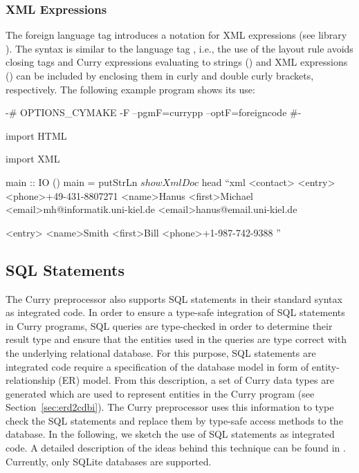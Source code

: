 \subsubsection{XML Expressions}

The foreign language tag  introduces a notation
for XML expressions (see \CYS library ).
The syntax is similar to the language tag ,
i.e., the use of the layout rule avoids closing tags
and Curry expressions evaluating to strings ()
and XML expressions () can be included by enclosing
them in curly and double curly brackets, respectively.
The following example program shows its use:
\begin{currynomath}
{-# OPTIONS_CYMAKE -F --pgmF=currypp --optF=foreigncode #-}

import HTML

import XML

main :: IO ()
main = putStrLn $ showXmlDoc $ head ``xml
 <contact>
  <entry>
   <phone>+49-431-8807271
   <name>Hanus
   <first>Michael
   <email>mh@informatik.uni-kiel.de
   <email>hanus@email.uni-kiel.de
   
  <entry>
   <name>Smith
   <first>Bill
   <phone>+1-987-742-9388
 ''
\end{currynomath}

\subsection{SQL Statements}
\label{sec:integratedsql}

The Curry preprocessor also supports SQL statements in their
standard syntax as integrated code.
In order to ensure a type-safe integration of SQL statements
in Curry programs, SQL queries are type-checked in order to
determine their result type and ensure that the
entities used in the queries are type correct with the
underlying relational database.
For this purpose, SQL statements are integrated code
require a specification of the database model
in form of entity-relationship (ER) model.
From this description, a set of Curry data types are generated
which are used to represent entities in the Curry program
(see Section~\ref{sec:erd2cdbi}).
The Curry preprocessor uses this information to type check
the SQL statements and replace them by type-safe access
methods to the database.
In the following, we sketch the use of SQL statements
as integrated code.
A detailed description of the ideas behind this technique
can be found in \cite{HanusKrone16WFLP}.
Currently, only SQLite databases are supported.


